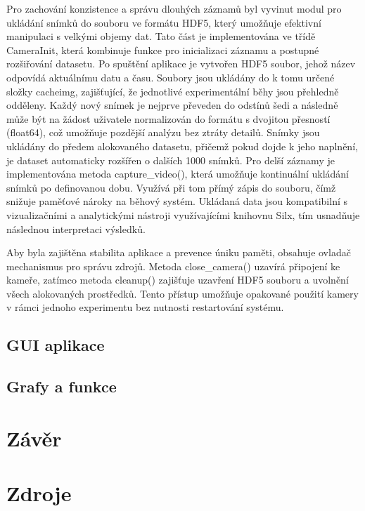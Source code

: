 \documentclass{article}
\begin{document}
Pro zachování konzistence a správu dlouhých záznamů byl vyvinut modul pro ukládání snímků do souboru ve formátu HDF5, který umožňuje efektivní manipulaci s velkými objemy dat. Tato část je implementována ve třídě CameraInit, která kombinuje funkce pro inicializaci záznamu a postupné rozšiřování datasetu. Po spuštění aplikace je vytvořen HDF5 soubor, jehož název odpovídá aktuálnímu datu a času. Soubory jsou ukládány do k tomu určené složky cacheimg, zajišťující, že jednotlivé experimentální běhy jsou přehledně odděleny.
Každý nový snímek je nejprve převeden do odstínů šedi a následně může být na žádost uživatele normalizován do formátu s dvojitou přesností (float64), což umožňuje pozdější analýzu bez ztráty detailů. Snímky jsou ukládány do předem alokovaného datasetu, přičemž pokud dojde k jeho naplnění, je dataset automaticky rozšířen o dalších 1000 snímků. Pro delší záznamy je implementována metoda capture\_video(), která umožňuje kontinuální ukládání snímků po definovanou dobu. Využívá při tom přímý zápis do souboru, čímž snižuje paměťové nároky na běhový systém. Ukládaná data jsou kompatibilní s vizualizačními a analytickými nástroji využívajícími knihovnu Silx, tím usnadňuje následnou interpretaci výsledků.

Aby byla zajištěna stabilita aplikace a prevence úniku paměti, obsahuje ovladač mechanismus pro správu zdrojů. Metoda close\_camera() uzavírá připojení ke kameře, zatímco metoda cleanup() zajišťuje uzavření HDF5 souboru a uvolnění všech alokovaných prostředků. Tento přístup umožňuje opakované použití kamery v rámci jednoho experimentu bez nutnosti restartování systému.
    




\subsection{GUI aplikace}

\subsection{Grafy a funkce}

\section{Závěr}

\section{Zdroje}
\end{document}
